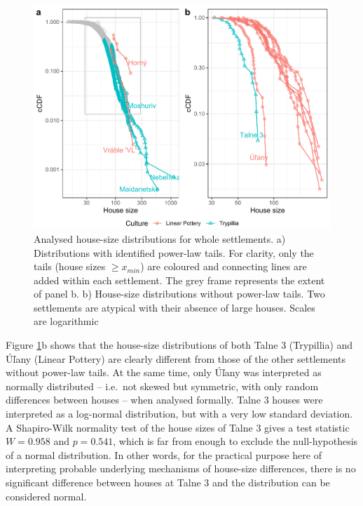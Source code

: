 \documentclass[
  12pt,
]{book}
\begin{document}
\begin{figure}

{\centering \includegraphics[width=0.9\linewidth]{bookdown-demo_files/figure-latex/06-settle-tails-1} 

}

\caption{Analysed house-size distributions for whole settlements. a) Distributions with identified power-law tails. For clarity, only the tails (house sizes \(\geq x_{min}\)) are coloured and connecting lines are added within each settlement. The grey frame represents the extent of panel b. b) House-size distributions without power-law tails. Two settlements are atypical with their absence of large houses. Scales are logarithmic}\label{fig:06-settle-tails}
\end{figure}

Figure \ref{fig:06-settle-tails}b shows that the house-size distributions of both Talne 3 (Trypillia) and Úľany (Linear Pottery) are clearly different from those of the other settlements without power-law tails. At the same time, only Úľany was interpreted as normally distributed -- i.e.~not skewed but symmetric, with only random differences between houses -- when analysed formally. Talne 3 houses were interpreted as a log-normal distribution, but with a very low standard deviation. A Shapiro-Wilk normality test of the house sizes of Talne 3 gives a test statistic \(W = 0.958\) and \(p = 0.541\), which is far from enough to exclude the null-hypothesis of a normal distribution. In other words, for the practical purpose here of interpreting probable underlying mechanisms of house-size differences, there is no significant difference between houses at Talne 3 and the distribution can be considered normal.
\end{document}
